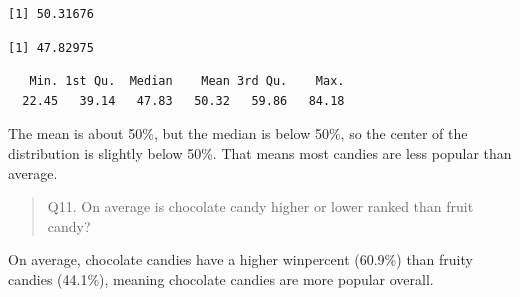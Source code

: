 \documentclass[
  letterpaper,
  DIV=11,
  numbers=noendperiod]{scrartcl}
\newenvironment{Shaded}{\begin{snugshade}}{\end{snugshade}}
\newcommand{\CommentTok}[1]{\textcolor[rgb]{0.37,0.37,0.37}{#1}}
\newcommand{\DecValTok}[1]{\textcolor[rgb]{0.68,0.00,0.00}{#1}}
\newcommand{\FunctionTok}[1]{\textcolor[rgb]{0.28,0.35,0.67}{#1}}
\newcommand{\NormalTok}[1]{\textcolor[rgb]{0.00,0.23,0.31}{#1}}
\newcommand{\OtherTok}[1]{\textcolor[rgb]{0.00,0.23,0.31}{#1}}
\newcommand{\SpecialCharTok}[1]{\textcolor[rgb]{0.37,0.37,0.37}{#1}}
\begin{document}
\begin{verbatim}
[1] 50.31676
\end{verbatim}

\begin{Shaded}
\end{Shaded}

\begin{verbatim}
[1] 47.82975
\end{verbatim}

\begin{Shaded}
\end{Shaded}

\begin{verbatim}
   Min. 1st Qu.  Median    Mean 3rd Qu.    Max. 
  22.45   39.14   47.83   50.32   59.86   84.18 
\end{verbatim}

The mean is about 50\%, but the median is below 50\%, so the center of
the distribution is slightly below 50\%. That means most candies are
less popular than average.

\begin{quote}
Q11. On average is chocolate candy higher or lower ranked than fruit
candy?
\end{quote}

On average, chocolate candies have a higher winpercent (60.9\%) than
fruity candies (44.1\%), meaning chocolate candies are more popular
overall.

\begin{Shaded}
\end{Shaded}
\end{document}
